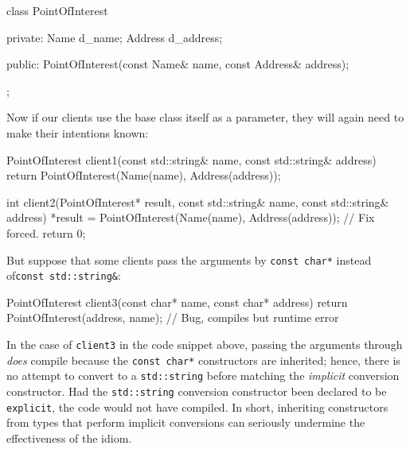 \begin{emcppslisting}[emcppsbatch=e11]
class PointOfInterest
{
private:
    Name    d_name;
    Address d_address;

public:
    PointOfInterest(const Name& name, const Address& address);
};
\end{emcppslisting}
    
\noindent Now if our clients use the base class itself as a parameter, they will
again need to make their intentions known:

\begin{emcppslisting}[emcppsbatch=e11]
PointOfInterest client1(const std::string& name, const std::string& address)    
{                                                                               
    return PointOfInterest(Name(name), Address(address));
} 

int client2(PointOfInterest*   result,                                          
            const std::string& name,                                            
            const std::string& address)                                         
{
   *result = PointOfInterest(Name(name), Address(address)); // Fix forced.     
    return 0;                                                                   
}
\end{emcppslisting}
    
\noindent But suppose that some clients pass the arguments by
\lstinline!const!~\lstinline!char*! instead of\linebreak[4]
\mbox{\lstinline!const!~\lstinline!std::string&!}:

\begin{emcppslisting}[emcppsbatch=e11]
PointOfInterest client3(const char* name, const char* address)
{
    return PointOfInterest(address, name);  // Bug, compiles but runtime error
}
\end{emcppslisting}
    
\noindent In the case of \lstinline!client3! in the code snippet above, passing the arguments through
\emph{does} compile because the \lstinline!const!~\lstinline!char*!
constructors are inherited; hence, there is no attempt to convert
to a \lstinline!std::string! before matching the \emph{implicit} conversion
constructor. Had the \lstinline!std::string! conversion
constructor been declared to be \lstinline!explicit!, the code would not
have compiled. In short, inheriting constructors from types that perform implicit
conversions can seriously undermine the effectiveness of the  idiom.

